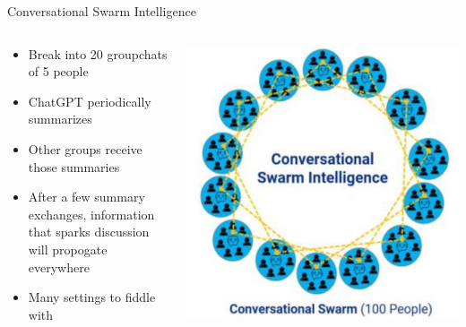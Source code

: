 \documentclass[aspectratio=169]{beamer}
\begin{document}
\begin{frame}{Conversational Swarm Intelligence}
\begin{columns}[T]
    \begin{column}[T]{0.5\textwidth}
        \begin{itemize}
            \item Break into 20 groupchats of 5 people
            \item ChatGPT periodically summarizes
            \item Other groups receive those summaries
            \item After a few summary exchanges, information that sparks discussion will propogate everywhere
            \item Many settings to fiddle with
        \end{itemize}
    \end{column}
    \begin{column}{0.5\textwidth}
        \includegraphics[height=0.8\textheight]{imgs/CSI_section/conversational_swarm.png}
    \end{column}
\end{columns}
\end{frame}
\end{document}

